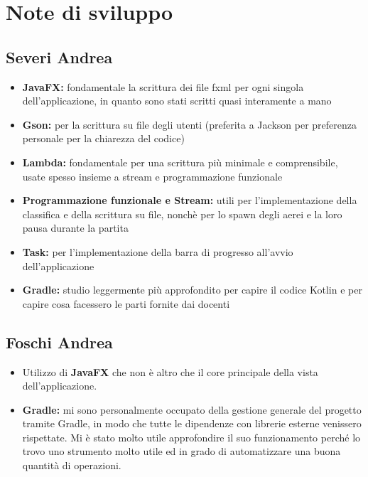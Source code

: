 \documentclass[a4paper,12pt]{report}
\begin{document}
\section{Note di sviluppo}
\subsection{Severi Andrea}
\begin{itemize}
    \item \textbf{JavaFX:} fondamentale la scrittura dei file fxml per ogni singola  dell'applicazione, in quanto sono stati scritti quasi interamente a mano
    \item \textbf{Gson:} per la scrittura su file degli utenti (preferita a Jackson per preferenza personale per la chiarezza del codice)
    \item \textbf{Lambda:} fondamentale per una scrittura più minimale e comprensibile, usate spesso insieme a stream e programmazione funzionale
    \item \textbf{Programmazione funzionale e Stream:} utili per l'implementazione della classifica e della scrittura su file, nonchè per lo spawn degli aerei e la loro pausa durante la partita
    \item \textbf{Task:} per l'implementazione della barra di progresso all'avvio dell'applicazione
    \item \textbf{Gradle:} studio leggermente più approfondito per capire il codice Kotlin e per capire cosa facessero le parti fornite dai docenti
\end{itemize}

\subsection{Foschi Andrea}
\begin{itemize}
    \item Utilizzo di \textbf{JavaFX} che non è altro che il core principale della vista dell’applicazione.
    \item \textbf{Gradle:} mi sono personalmente occupato della gestione generale del progetto tramite Gradle, in modo che tutte le dipendenze con librerie esterne venissero rispettate. Mi è stato molto utile approfondire il suo funzionamento perché lo trovo uno strumento molto utile ed in grado di automatizzare una buona quantità di operazioni.
\end{itemize}
\end{document}
